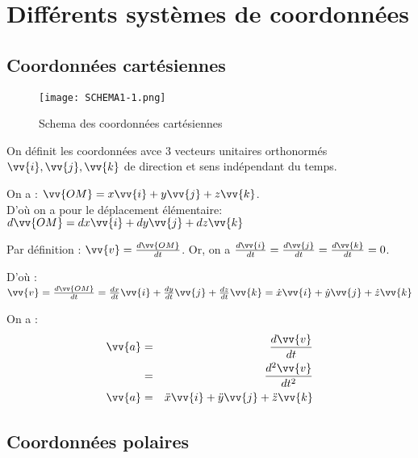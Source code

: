 \chapter{Différents systèmes de coordonnées}
\section{Coordonnées cartésiennes}


\begin{figure}[!htb]
    \centering
    \texttt{[image: SCHEMA1-1.png]}
    \caption{Schema des coordonnées cartésiennes}
    \label{fig:SCHEMA-COCA}
\end{figure}


\begin{definition}\label{def:coordcart}
    On définit les coordonnées avce 3 vecteurs unitaires orthonormés \(\vv{i}, \vv{j}, \vv{k}\) de direction et sens indépendant du temps.
\end{definition}

\begin{corollary}\label{col:cartpos}
    On a : \(\vv{OM} = x \vv{i} + y \vv{j}+ z\vv{k}\). \\
    D'où on a pour le déplacement élémentaire: \(d \vv{OM} = dx\vv{i}+dy\vv{j}+dz\vv{k}\) 
\end{corollary}

\begin{corollary}\label{col:vitcart}
    Par définition : \(\vv{v} = \frac{d \vv{OM}}{dt}\). Or, on a \(\frac{d \vv{i}}{dt} = \frac{d\vv{j}}{dt} = \frac{d\vv{k}}{dt} = 0\).\par D'où :
    \(\vv{v} = \frac{d \vv{OM}}{dt} = \frac{dx}{dt}\vv{i} + \frac{dy}{dt}\vv{j} + \frac{dz}{dt}\vv{k} = \dot{x}\vv{i}+ \dot{y}\vv{j} + \dot{z}\vv{k}\)   
\end{corollary}
\newpage
\begin{corollary}\label{col:accelcart}
    On a : 
    \begin{eqnarray*}
        \vv{a} &=& \frac{d\vv{v}}{dt}\\
        &=& \frac{d^{2}\vv{v}}{dt^{2}}\\
        \vv{a} &=& \ddot{x}\vv{i} + \ddot{y}\vv{j} + \ddot{z}\vv{k}
    \end{eqnarray*}
\end{corollary}

\section{Coordonnées polaires}

